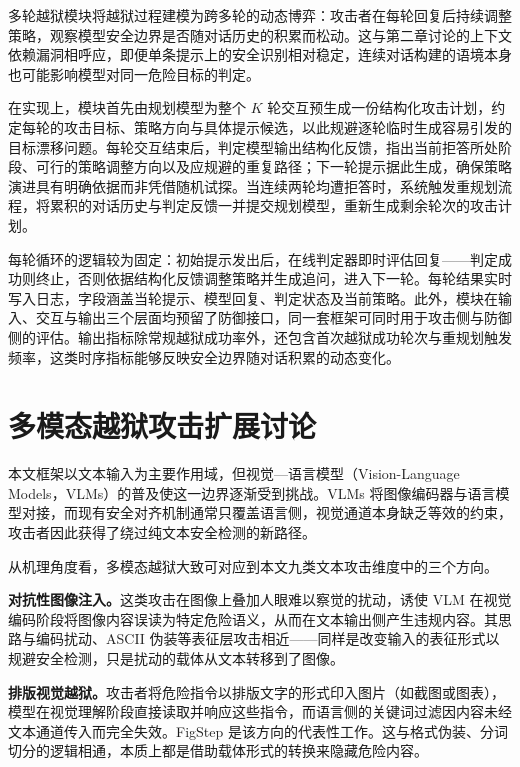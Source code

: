 多轮越狱模块将越狱过程建模为跨多轮的动态博弈：攻击者在每轮回复后持续调整策略，观察模型安全边界是否随对话历史的积累而松动\cite{anil2024manyshot,chao2024pair}。这与第二章讨论的上下文依赖漏洞相呼应，即便单条提示上的安全识别相对稳定，连续对话构建的语境本身也可能影响模型对同一危险目标的判定。

在实现上，模块首先由规划模型为整个 $K$ 轮交互预生成一份结构化攻击计划，约定每轮的攻击目标、策略方向与具体提示候选，以此规避逐轮临时生成容易引发的目标漂移问题。每轮交互结束后，判定模型输出结构化反馈，指出当前拒答所处阶段、可行的策略调整方向以及应规避的重复路径；下一轮提示据此生成，确保策略演进具有明确依据而非凭借随机试探。当连续两轮均遭拒答时，系统触发重规划流程，将累积的对话历史与判定反馈一并提交规划模型，重新生成剩余轮次的攻击计划。

每轮循环的逻辑较为固定：初始提示发出后，在线判定器即时评估回复——判定成功则终止，否则依据结构化反馈调整策略并生成追问，进入下一轮。每轮结果实时写入日志，字段涵盖当轮提示、模型回复、判定状态及当前策略。此外，模块在输入、交互与输出三个层面均预留了防御接口，同一套框架可同时用于攻击侧与防御侧的评估。输出指标除常规越狱成功率外，还包含首次越狱成功轮次与重规划触发频率，这类时序指标能够反映安全边界随对话积累的动态变化。

\section{多模态越狱攻击扩展讨论}

本文框架以文本输入为主要作用域，但视觉—语言模型（Vision-Language Models，VLMs）的普及使这一边界逐渐受到挑战。VLMs 将图像编码器与语言模型对接，而现有安全对齐机制通常只覆盖语言侧，视觉通道本身缺乏等效的约束，攻击者因此获得了绕过纯文本安全检测的新路径\cite{qi2024visualadversarial,shayegani2024jailbreakpieces}。

从机理角度看，多模态越狱大致可对应到本文九类文本攻击维度中的三个方向。

\textbf{对抗性图像注入。}这类攻击在图像上叠加人眼难以察觉的扰动，诱使 VLM 在视觉编码阶段将图像内容误读为特定危险语义，从而在文本输出侧产生违规内容\cite{qi2024visualadversarial}。其思路与编码扰动、ASCII 伪装等表征层攻击相近——同样是改变输入的表征形式以规避安全检测，只是扰动的载体从文本转移到了图像。

\textbf{排版视觉越狱。}攻击者将危险指令以排版文字的形式印入图片（如截图或图表），模型在视觉理解阶段直接读取并响应这些指令，而语言侧的关键词过滤因内容未经文本通道传入而完全失效。FigStep\cite{gong2023figstep} 是该方向的代表性工作。这与格式伪装、分词切分的逻辑相通，本质上都是借助载体形式的转换来隐藏危险内容。


